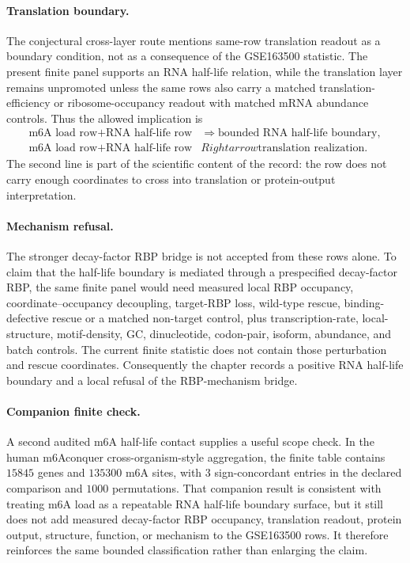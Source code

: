 \paragraph{Translation boundary.}
The conjectural cross-layer route mentions same-row translation readout as a boundary condition, not as a consequence of the GSE163500 statistic. The present finite panel supports an RNA half-life relation, while the translation layer remains unpromoted unless the same rows also carry a matched translation-efficiency or ribosome-occupancy readout with matched mRNA abundance controls. Thus the allowed implication is
$$
\begin{aligned}
\text{m6A load row} + \text{RNA half-life row}
&\Longrightarrow \text{bounded RNA half-life boundary},\\
\text{m6A load row} + \text{RNA half-life row}
&
Rightarrow \text{translation realization}.
\end{aligned}
$$
The second line is part of the scientific content of the record: the row does not carry enough coordinates to cross into translation or protein-output interpretation.

\paragraph{Mechanism refusal.}
The stronger decay-factor RBP bridge is not accepted from these rows alone. To claim that the half-life boundary is mediated through a prespecified decay-factor RBP, the same finite panel would need measured local RBP occupancy, coordinate--occupancy decoupling, target-RBP loss, wild-type rescue, binding-defective rescue or a matched non-target control, plus transcription-rate, local-structure, motif-density, GC, dinucleotide, codon-pair, isoform, abundance, and batch controls. The current finite statistic does not contain those perturbation and rescue coordinates. Consequently the chapter records a positive RNA half-life boundary and a local refusal of the RBP-mechanism bridge.

\paragraph{Companion finite check.}
A second audited m6A half-life contact supplies a useful scope check. In the human m6Aconquer cross-organism-style aggregation, the finite table contains $15845$ genes and $135300$ m6A sites, with $3$ sign-concordant entries in the declared comparison and $1000$ permutations. That companion result is consistent with treating m6A load as a repeatable RNA half-life boundary surface, but it still does not add measured decay-factor RBP occupancy, translation readout, protein output, structure, function, or mechanism to the GSE163500 rows. It therefore reinforces the same bounded classification rather than enlarging the claim.

